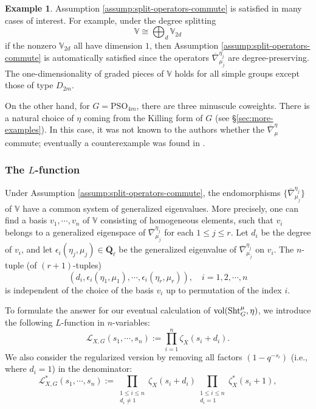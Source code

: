 \documentclass[reqno]{amsart}
\numberwithin{equation}{subsection}
\theoremstyle{definition}
\newtheorem{exam}[subsubsection]{Example}
\def\VV{\mathbb{V}}
\newcommand{\sL}{{\mathscr{L}}}
\newcommand\Sht{\textup{Sht}}
\newcommand{\vol}{\textup{vol}}
\newcommand{\Qlbar}{\overline{\Q}_\ell}
\newcommand{\ov}{\overline}
\newcommand{\y}{\eta}
\newcommand{\z}{\zeta}
\newcommand{\ep}{\epsilon}
\newcommand\nb{\nabla}
\newcommand{\Q}{\mathbf{Q}}
\newcommand{\ol}[1]{\overline{#1}}
\begin{document}
\begin{exam}\label{ex:assumption-satisfied}
Assumption \ref{assump:split-operators-commute} is satisfied in many cases of interest. For example, under the degree splitting  
\[
\VV \cong \bigoplus_{d} \VV_{2d}
\]
if the nonzero $\VV_{2d}$ all have dimension $1$, then Assumption \ref{assump:split-operators-commute} is automatically satisfied since the operators $\ov\nb^{\y_j}_{\mu_j}$ are degree-preserving. The one-dimensionality of graded pieces of $\VV$ holds for all simple groups except those of type $D_{2m}$. 



On the other hand, for $G = \mathrm{PSO}_{4m}$, there are three minuscule coweights. There is a natural choice of $\eta$ coming from the Killing form of $G$ (see \S \ref{sec:more-examples}). In this case, it was not known to the authors whether the $\ol \nabla^{\eta}_{\mu}$ commute; eventually a counterexample was found in \cite{FAI}.
\end{exam}


\subsubsection{The $L$-function} Under Assumption \ref{assump:split-operators-commute}, the endomorphisms $\{\ov\nb^{\y_j}_{\mu_j}\}$ of $\VV$ have a common system of generalized eigenvalues. More precisely, one can find a basis $v_1,\cdots, v_n$ of $\VV$ consisting of homogeneous elements, such that $v_i$ belongs to a generalized eigenspace of  $\ov\nb^{\y_j}_{\mu_j}$ for each $1\le j\le r$. Let $d_i$ be the degree of $v_i$, and let $\ep_i(\y_j, \mu_j)\in \Qlbar$ be the generalized eigenvalue of $\ov\nb^{\y_j}_{\mu_j}$ on $v_i$. The $n$-tuple (of $(r+1)$-tuples)
\begin{equation*}
    \left(d_i, \ep_i(\y_1, \mu_1),\cdots, \ep_i(\y_r, \mu_r)\right), \quad i=1,2,\cdots, n
\end{equation*}
is independent of the choice of the basis $v_i$ up to permutation of the index $i$. 

To formulate the answer for our eventual calculation of $\vol(\Sht_G^\mu, \eta)$, we introduce the following $L$-function in $n$-variables:
\begin{equation}\label{eq: L of G}
\sL_{X, G}(s_{1},\cdots, s_{n}) :=\prod_{i=1}^{n}\z_{X}(s_{i}+d_{i}).
\end{equation}
We also consider the regularized version by removing all factors $(1-q^{-s_{i}})$ (i.e., where $d_{i}=1$) in the denominator:
\begin{equation}\label{eq: L with pole}
\sL_{X, G}^*(s_{1},\cdots, s_{n}) :=\prod_{\substack{1\le i\le n \\ d_{i}\ne1}}\z_{X}(s_{i}+d_{i})\prod_{\substack{1\le i\le n \\ d_{i}=1}}\z^{*}_{X}(s_{i}+1),
\end{equation}
\end{document}
